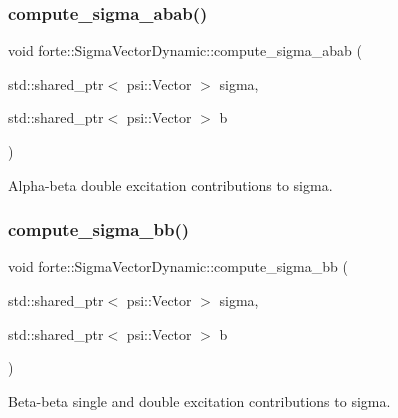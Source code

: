 \subsubsection{\texorpdfstring{compute\+\_\+sigma\+\_\+abab()}{compute\_sigma\_abab()}}
{\footnotesize\ttfamily void forte\+::\+Sigma\+Vector\+Dynamic\+::compute\+\_\+sigma\+\_\+abab (\begin{DoxyParamCaption}\item[{std\+::shared\+\_\+ptr$<$ psi\+::\+Vector $>$}]{sigma,  }\item[{std\+::shared\+\_\+ptr$<$ psi\+::\+Vector $>$}]{b }\end{DoxyParamCaption})\hspace{0.3cm}{\ttfamily [protected]}}



Alpha-\/beta double excitation contributions to sigma. 

\mbox{\label{classforte_1_1_sigma_vector_dynamic_a4cd2eff1fd65a16afd4a9be40abfed23}} 
\subsubsection{\texorpdfstring{compute\+\_\+sigma\+\_\+bb()}{compute\_sigma\_bb()}}
{\footnotesize\ttfamily void forte\+::\+Sigma\+Vector\+Dynamic\+::compute\+\_\+sigma\+\_\+bb (\begin{DoxyParamCaption}\item[{std\+::shared\+\_\+ptr$<$ psi\+::\+Vector $>$}]{sigma,  }\item[{std\+::shared\+\_\+ptr$<$ psi\+::\+Vector $>$}]{b }\end{DoxyParamCaption})\hspace{0.3cm}{\ttfamily [protected]}}



Beta-\/beta single and double excitation contributions to sigma. 

\mbox{\label{classforte_1_1_sigma_vector_dynamic_a997eaf87b10fdd2ea9e65dc28a4f5707}} 
